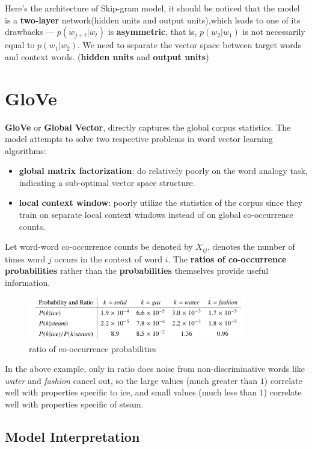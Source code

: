 \documentclass[a3paper, 12pt]{book} %
\begin{document}
Here's the architecture of Skip-gram model, it should be noticed that the model is a \textbf{two-layer} network(hidden units and output units),which leads to one of its drawbacks --- $p(w_{j+t}|w_t)$ is \textbf{asymmetric}, that is, $p(w_2|w_1)$ is not necessarily equal to $p(w_1|w_2)$. We need to separate the vector space between target words and context words. (\textbf{hidden units} and \textbf{output units})


\section{GloVe}
\textbf{GloVe} or \textbf{Global Vector}, directly captures the global corpus statistics. The model attempts to solve two respective problems in word vector learning algorithms:

\begin{itemize}
	\item \textbf{global matrix factorization}: do relatively poorly on the word analogy task, indicating a sub-optimal vector space structure. 
	\item \textbf{local context window}: poorly utilize the statistics of the corpus since they train on separate local context windows instead of on global co-occurrence counts.
\end{itemize}

Let word-word co-occurrence counts be denoted by $X_{ij}$, denotes the number of times word $j$ occurs in the context of word $i$. The \textbf{ratios of co-occurrence probabilities} rather than the \textbf{probabilities} themselves provide useful information.

\begin{figure}[htpb]
	\centering
	\includegraphics[width=9.5cm]{figures/glove_co-occurrence_ratio.png}
	\caption{ratio of co-occurrence probabilities}
	\label{fig:boat1}
\end{figure}

In the above example, only in ratio does noise from non-discriminative  words like \emph{water} and \emph{fashion} cancel out, so the large values (much greater than $1$) correlate well with properties specific to ice, and small values (much less than $1$) correlate well with properties specific of steam.

\subsection{Model Interpretation}
\end{document}
